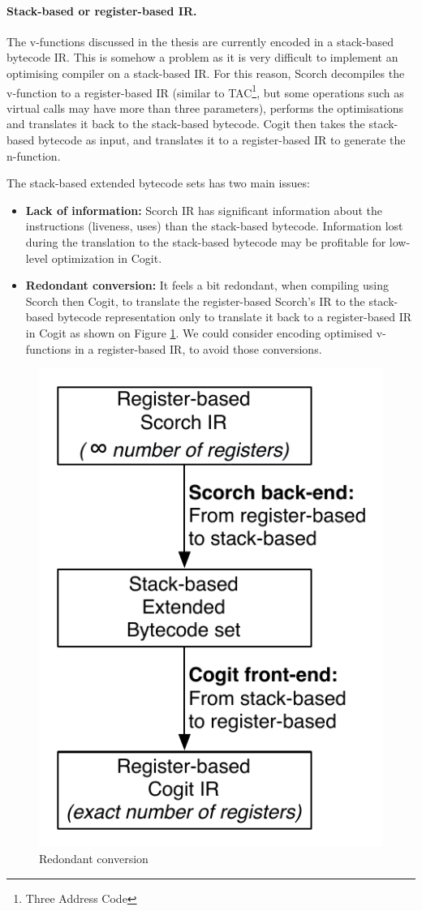 \documentclass[a4paper,12pt,twoside]{../includes/ThesisStyle}
\begin{document}
\paragraph{Stack-based or register-based IR.}The v-functions discussed in the thesis are currently encoded in a stack-based bytecode IR. This is somehow a problem as it is very difficult to implement an optimising compiler on a stack-based IR. For this reason, Scorch decompiles the v-function to a register-based IR (similar to TAC\footnote{Three Address Code}, but some operations such as virtual calls may have more than three parameters), performs the optimisations and translates it back to the stack-based bytecode. Cogit then takes the stack-based bytecode as input, and translates it to a register-based IR to generate the n-function. 

The stack-based extended bytecode sets has two main issues:
\begin{itemize}
	\item \textbf{Lack of information:} Scorch IR has significant information about the instructions (liveness, uses) than the stack-based bytecode. Information lost during the translation to the stack-based bytecode may be profitable for low-level optimization in Cogit.
	\item \textbf{Redondant conversion:} It feels a bit redondant, when compiling using Scorch then Cogit, to translate the register-based Scorch's IR to the stack-based bytecode representation only to translate it back to a register-based IR in Cogit as shown on Figure \ref{fig:FutureWorkRedondant}. We could consider encoding optimised v-functions in a register-based IR, to avoid those conversions.
\end{itemize}

\begin{figure}[h!]
    \begin{center}
        \includegraphics[width=0.4\linewidth]{FutureWorkRedondant}
        \caption{Redondant conversion}
        \label{fig:FutureWorkRedondant}
    \end{center}
\end{figure}
\end{document}
